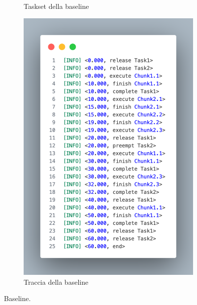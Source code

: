 \begin{figure}[htbp]
    \centering
    \begin{subfigure}{0.45\textwidth}
        \vfill
        \centering
        \caption{Taskset della baseline}
        \label{fig:baselineTaskset}
        \vfill
    \end{subfigure}
    \hfill
    \begin{subfigure}{0.45\textwidth}
        \vfill
        \centering
        \includegraphics[width=.9\textwidth]{immagini/trace baseline.pdf}
        \caption{Traccia della baseline}
        \label{fig:baselineTrace}
        \vfill
    \end{subfigure}
    \caption{Baseline.}
\end{figure}

